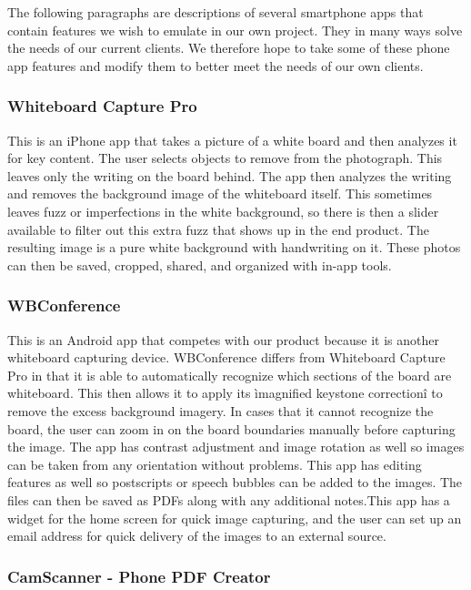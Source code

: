 \documentclass{article}
\begin{document}
The following paragraphs are descriptions of several smartphone apps that contain features we wish to emulate in our own project. They in many ways solve the needs of our current clients. We therefore hope to take some of these phone app features and modify them to better meet the needs of our own clients. \\
				\subsubsection*{Whiteboard Capture Pro}
					
This is an iPhone app that takes a picture of a white board and then analyzes it for key content. The user selects objects to remove from the photograph. This leaves only the writing on the board behind. The app then analyzes the writing and removes the background image of the whiteboard itself. This sometimes leaves fuzz or imperfections in the white background, so there is then a slider available to filter out this extra fuzz that shows up in the end product. The resulting image is a pure white background with handwriting on it. These photos can then be saved, cropped, shared, and organized with in-app tools. \cite{wcp} \\
				\subsubsection*{WBConference}
					
This is an Android app that competes with our product because it is another whiteboard capturing device. WBConference differs from Whiteboard Capture Pro in that it is able to automatically recognize which sections of the board are whiteboard. This then allows it to apply its ìmagnified keystone correctionî to remove the excess background imagery. In cases that it cannot recognize the board, the user can zoom in on the board boundaries manually before capturing the image. The app has contrast adjustment and image rotation as well so images can be taken from any orientation without problems. This app has editing features as well so postscripts or speech bubbles can be added to the images. The files can then be saved as PDFs along with any additional notes.This app has a widget for the home screen for quick image capturing, and the user can set up an email address for quick delivery of the images to an external source. \cite{wbc} \\
				\subsubsection*{CamScanner - Phone PDF Creator}
					
\end{document}
